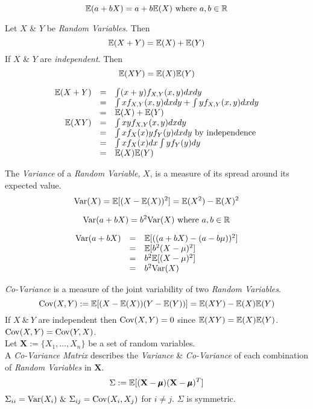 \documentclass[11pt,a4paper]{article}
\begin{document}
$$\mathbb{E}(a+bX)=a+b\mathbb{E}(X)\text{ where }a,b\in\mathbb{R}$$

Let $X$ \& $Y$ be \textit{Random Variables}. Then
$$\mathbb{E}(X+Y)=\mathbb{E}(X)+\mathbb{E}(Y)$$
If $X$ \& $Y$ are \textit{independent}. Then
$$\mathbb{E}(XY)=\mathbb{E}(X)\mathbb{E}(Y)$$

\[\begin{array}{rcl}
\mathbb{E}(X+Y)&=&\int(x+y)f_{X,Y}(x,y)dxdy\\
&=&\int xf_{X,Y}(x,y)dxdy+\int yf_{X,Y}(x,y)dxdy\\
&=&\mathbb{E}(X)+\mathbb{E}(Y)\\
\mathbb{E}(XY)&=&\int xyf_{X,Y}(x,y)dxdy\\
&=&\int xf_X(x)yf_Y(y)dxdy\text{ by independence}\\
&=&\int xf_X(x)dx\int yf_Y(y)dy\\
&=&\mathbb{E}(X)\mathbb{E}(Y)
\end{array}\]

The \textit{Variance} of a \textit{Random Variable}, $X$, is a measure of its spread around its expected value.
$$\mathrm{Var}(X)=\mathbb{E}[(X-\mathbb{E}(X))^2]=\mathbb{E}(X^2)-\mathbb{E}(X)^2$$

$$\mathrm{Var}(a+bX)=b^2\mathrm{Var}(X)\text{ where }a,b\in\mathbb{R}$$

\[\begin{array}{rcl}
\mathrm{Var}(a+bX)&=&\mathbb{E}[((a+bX)-(a-b\mu))^2]\\
&=&\mathbb{E}[b^2(X-\mu)^2]\\
&=&b^2\mathbb{E}[(X-\mu)^2]\\
&=&b^2\mathrm{Var}(X)
\end{array}\]

\textit{Co-Variance} is a measure of the joint variability of two \textit{Random Variables}.
$$\mathrm{Cov}(X,Y):=\mathbb{E}[(X-\mathbb{E}(X))(Y-\mathbb{E}(Y))]=\mathbb{E}(XY)-\mathbb{E}(X)\mathbb{E}(Y)$$
\nb If $X\ \&\ Y$ are independent then $\mathrm{Cov}(X,Y)=0$ since $\mathbb{E}(XY)=\mathbb{E}(X)\mathbb{E}(Y)$.\\
\nb $\mathrm{Cov}(X,Y)=\mathrm{Cov}(Y,X)$.\\

Let $\textbf{X}:=\{X_1,\dots,X_n\}$ be a set of random variables.\\
A \textit{Co-Variance Matrix} describes the \textit{Variance} \& \textit{Co-Variance} of each combination of \textit{Random Variables} in $\textbf{X}$.\\
$$\Sigma:=\mathbb{E}[(\textbf{X}-\pmb\mu)(\textbf{X}-\pmb\mu)^T]$$
\nb $\Sigma_{ii}=\var(X_i)\ \&\ \Sigma_{ij}=\cov(X_i,X_j)$ for $i\neq j$. $\Sigma$ is symmetric.\\
\end{document}
